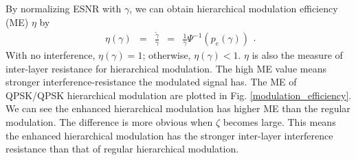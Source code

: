 \documentclass[conference]{IEEEtran}
\begin{document}
By normalizing ESNR with $\gamma$, we can obtain hierarchical
modulation efficiency (ME) $\eta$ by
\begin{equation}
\begin{array}{rcccl}
\eta\left(\gamma\right)&=&\frac{\tilde{\gamma}}{\gamma}&=&\frac{1}{\gamma}\Psi^{-1}\left(p_{e}(\gamma)\right)
\end{array}.\label{mod_eff}
\end{equation}
\noindent With no interference, $\eta\left(\gamma\right)=1$;
otherwise, $\eta\left(\gamma\right)<1$. $\eta$ is also the measure
of inter-layer resistance for hierarchical modulation. The high ME
value means stronger interference-resistance the modulated signal
has. The ME of QPSK/QPSK hierarchical modulation are plotted in
Fig. \ref{modulation_efficiency}. We can see the enhanced
hierarchical modulation has higher ME than the regular modulation.
The difference is more obvious when $\zeta$ becomes large. This
means the enhanced hierarchical modulation has the stronger
inter-layer interference resistance than that of regular
hierarchical modulation.
\begin{figure}
\end{figure}
\end{document}
